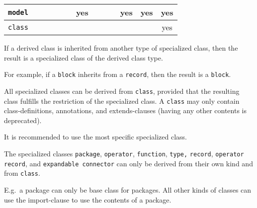 \begin{center}
{\begin{tabular}{|c||c|c|c|c|c|c|c|c|c|c|c|c|}
    \hline
    \lstinline!model!             &                          &                           &                                            &                      &                          & \cellcolor{lightgray}yes &                          &                          &                            & \cellcolor{lightgray}yes & yes                    & \cellcolor{lightgray}yes                   \\
    \hline
    \lstinline!class!             &                          &                           &                                            &                      &                          &                          &                          &                          &                            &                          &                        & yes                                        \\
    \hline
\end{tabular}
\ifpdf}\else\fi%
\end{center}

If a derived class is inherited from another type of specialized class,
then the result is a specialized class of the derived class type.

\begin{nonnormative}
For example, if a \lstinline!block! inherits from a \lstinline!record!, then the result is a \lstinline!block!.
\end{nonnormative}

All specialized classes can be derived from \lstinline!class!, provided that the
resulting class fulfills the restriction of the specialized class.  A \lstinline!class! may
only contain class-definitions, annotations, and extends-clauses (having
any other contents is deprecated).

\begin{nonnormative}
It is recommended to use the most specific specialized class.
\end{nonnormative}

The specialized classes \lstinline!package!, \lstinline!operator!, \lstinline!function!,
\lstinline!type,! \lstinline!record!,
\lstinline!operator record!, and \lstinline!expandable connector! can only be derived from their
own kind and from \lstinline!class!.

\begin{nonnormative}
E.g.\ a package can only be base class for packages.  All other kinds of classes can use the import-clause to use the contents of a package.
\end{nonnormative}

